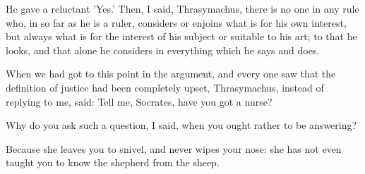 He gave a reluctant 'Yes.'
Then, I said, Thrasymachus, there is no one in any rule who, in so far as he is a ruler, considers or enjoins what is for his own interest, but always what is for the interest of his subject or suitable to his art; to that he looks, and that alone he considers in everything which he says and does.

When we had got to this point in the argument, and every one saw that the definition of justice had been completely upset, Thrasymachus, instead of replying to me, said: Tell me, Socrates, have you got a nurse?

Why do you ask such a question, I said, when you ought rather to be answering?

Because she leaves you to snivel, and never wipes your nose: she has not even taught you to know the shepherd from the sheep.

